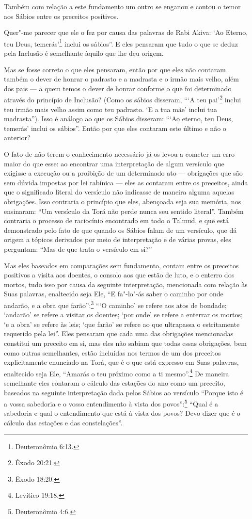 Também com relação a este fundamento um outro se enganou e contou o
temor aos Sábios entre os preceitos positivos.

Quer"-me parecer que ele o fez por causa das palavras de Rabi Akiva\starr: `Ao
Eterno, teu Deus, temerás'\footnote{Deuteronômio 6:13.} inclui os sábios''. E
eles pensaram que tudo o que se deduz pela Inclusão é semelhante àquilo
que lhe deu origem.

Mas se fosse correto o que eles pensaram, então por que eles não
contaram também o dever de honrar o padrasto e a madrasta e o irmão mais
velho, além dos pais --- a quem temos o dever de honrar conforme o que
foi determinado através do princípio de Inclusão? (Como os sábios
disseram, ```A teu pai'\footnote{Êxodo 20:21.} inclui teu irmão mais velho assim
como teu padrasto. `E a tua mãe' inclui tua madrasta''). Isso é análogo
ao que os Sábios disseram: ```Ao eterno, teu Deus, temerás' inclui os
sábios''. Então por que eles contaram este último e não o anterior?

O fato de não terem o conhecimento necessário já os levou a cometer um
erro maior do que esse: ao encontrar uma interpretação de algum
versículo que exigisse a execução ou a proibição de um determinado ato
--- obrigações que são sem dúvida impostas por lei rabínica --- eles as
contaram entre os preceitos, ainda que o significado literal do
versículo não indicasse de maneira alguma aquelas obrigações. Isso
contraria o princípio que eles, abençoada seja sua memória, nos
ensinaram: ``Um versículo da Torá\starr{} não perde nunca seu sentido
literal''. Também contraria o processo de raciocínio encontrado em todo
o Talmud\starr, e que está demonstrado pelo fato de que quando os Sábios falam
de um versículo, que dá origem a tópicos derivados por meio de
interpretação e de várias provas, eles perguntam: ``Mas de que trata o
versículo em si?''

Mas eles baseados em comparações sem fundamento, contam entre os
preceitos positivos a visita aos doentes, o consolo aos que estão de
luto, e o enterro dos mortos, tudo isso por causa da seguinte
interpretação, mencionada com relação às Suas palavras, enaltecido seja
Ele, ``E fa"-lo"-ás saber o caminho por onde andarão, e a obra que
farão'':\footnote{Êxodo 18:20.} ```O caminho' se refere aos atos de bondade;
`andarão' se refere a visitar os doentes; `por onde' se refere a
enterrar os mortos; `e a obra' se refere às leis; `que farão' se refere
ao que ultrapassa o estritamente requerido pela lei''. Eles pensaram que
cada uma das obrigações mencionadas constitui um preceito em si, mas
eles não sabiam que todas essas obrigações, bem como outras
semelhantes, estão incluídas nos termos de um dos preceitos
explicitamente enunciado na Torá\starr, que é o que está expresso em Suas
palavras, enaltecido seja Ele, ``Amarás o teu próximo como a ti mesmo''.\footnote{Levítico 19:18.} De maneira semelhante eles contaram o cálculo das
estações do ano como um preceito, baseados na seguinte interpretação
dada pelos Sábios ao versículo ``Porque isto é a vossa sabedoria e o
vosso entendimento à vista dos povos'':\footnote{Deuteronômio 4:6.} ``Qual é a
sabedoria e qual o entendimento que está à vista dos povos? Devo dizer
que é o cálculo das estações e das constelações''.


